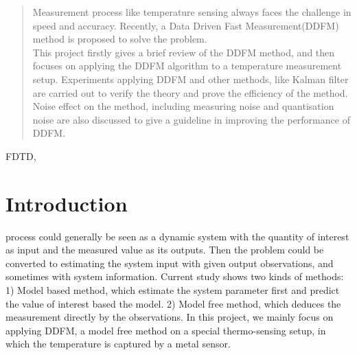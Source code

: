 \documentclass[journal]{IEEEtran}
\begin{document}
\begin{abstract}
Measurement process like temperature sensing always faces the challenge in speed and accuracy. Recently, a Data Driven Fast Measurement(DDFM) method is proposed to solve the problem. \\
This project firstly gives a brief review of the DDFM method, and then focuses on applying the DDFM algorithm to a temperature measurement setup. Experiments applying DDFM and other methods, like Kalman filter are carried out to verify the theory and prove the efficiency of the method. Noise effect on the method, including measuring noise and quantisation noise are also discussed to give a guideline in improving the performance of DDFM. 

\end{abstract}

\begin{IEEEkeywords}
FDTD, 
\end{IEEEkeywords}


\section{Introduction}
% 
% 
% 
% 


 process could generally be seen as a dynamic system with the quantity of interest as input and the measured value as its outputs. Then the problem could be converted to estimating the system input with given output observations, and sometimes with system information. Current study shows two kinds of methods: 1) Model based method, which estimate the system parameter first and predict the value of interest based the model. 2) Model free method, which deduces the measurement directly by the observations. In this project, we mainly focus on applying DDFM, a model free method on a special thermo-sensing setup, in which the temperature is captured by a metal sensor.
\end{document}
